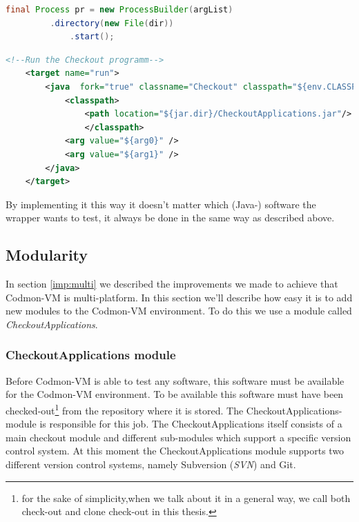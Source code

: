 \documentclass{article}
\newcommand{\project}{Codmon-VM}
\begin{document}
\begin{lstlisting}[frame=shadowbox, language=Java,showstringspaces=false]
final Process pr = new ProcessBuilder(argList)
 		 .directory(new File(dir)) 
    		 .start();
\end{lstlisting} 

\begin{lstlisting}[frame=shadowbox, language=XML,showstringspaces=false]
	<!--Run the Checkout programm-->
	<target name="run">
		<java  fork="true" classname="Checkout" classpath="${env.CLASSPATH}" output="out.txt">
	  		<classpath>
				<path location="${jar.dir}/CheckoutApplications.jar"/>
	        	</classpath>
			<arg value="${arg0}" />
			<arg value="${arg1}" />
		</java>
	</target>
\end{lstlisting} 

\noindent By implementing it this way it doesn't matter which (Java-) software the wrapper wants to test, it always be done in the same way as described above.


\subsection{Modularity}
\label{imp:modular}
In section \ref{imp:multi} we described the improvements we made to achieve that \project{} is multi-platform. In this section we'll describe how easy it is to add new modules to the \project{} environment. 
To do this we use a module called \emph{CheckoutApplications}.


\subsubsection{CheckoutApplications module}
\label{imp:checkout}
Before \project{} is able to test any software, this software must be available for the \project{} environment. To be available this software must have been checked-out\footnote{for the sake of simplicity,when 
we talk about it in a general way, we call both check-out and clone check-out in this thesis.} from the repository where it is stored. The CheckoutApplications-module is responsible for this job. The CheckoutApplications 
itself consists of a main checkout module and different sub-modules which support a specific version control system. At this moment the CheckoutApplications module supports two different version control 
systems, namely Subversion (\emph{SVN}) and Git.\\
\end{document}
